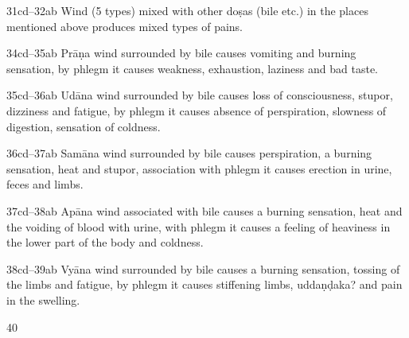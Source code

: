 \begin{translation}
\item[31cd--32ab] Wind (5 types) mixed with other doṣas (bile etc.) in the 
places mentioned above produces mixed types of pains.

\item[34cd--35ab] Prāṇa wind surrounded by bile causes vomiting and burning 
sensation, by phlegm it causes weakness, exhaustion, laziness and bad taste. 

\item[35cd--36ab] Udāna wind surrounded by bile causes loss of 
consciousness, stupor, dizziness and fatigue, by phlegm it causes absence of 
perspiration, slowness of digestion, sensation of coldness.

\item[36cd--37ab] Samāna wind surrounded by bile causes perspiration, a 
burning sensation, heat and stupor, association with phlegm it causes erection 
in 
urine, feces and limbs.  

\item[37cd--38ab] Apāna wind associated with bile causes a burning sensation, 
heat and the voiding of blood with urine, with phlegm it causes a feeling of 
heaviness in the lower part of the body and coldness.

\item[38cd--39ab] Vyāna wind surrounded by bile causes a burning sensation, 
tossing of the limbs and fatigue, by phlegm it causes stiffening limbs, 
uddaṇḍaka? and pain in the swelling.

\item[40]



\end{translation}
